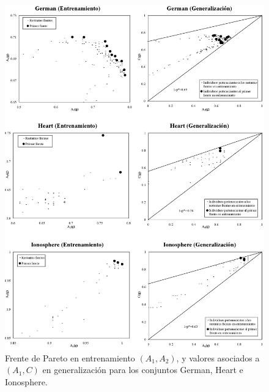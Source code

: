 \begin{figure}[!htb]
\centering
	\includegraphics[keepaspectratio,width=13cm]{figuras/tanda2.jpg}
\caption{Frente de Pareto en entrenamiento $(A_{1},A_{2})$, y valores asociados a
$(A_{1},C)$ en generalización para los conjuntos German, Heart e Ionosphere.}
\label{tanda2}
\end{figure}

